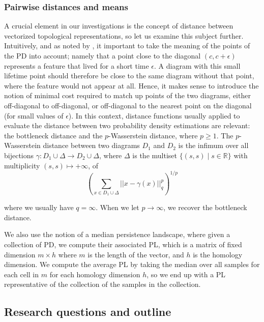 \documentclass{article}
\begin{document}
\subsubsection{Pairwise distances and means}

A crucial element in our investigations is the concept of distance between vectorized topological representations, so let us examine this subject further. Intuitively, and as noted by \citep{berwald2018computing}, it important to take the meaning of the points of the PD into account; namely that a point close to the diagonal $(c,c+\epsilon)$ represents a feature that lived for a short time $\epsilon$. A diagram with this small lifetime point should therefore be close to the same diagram without that point, where the feature would not appear at all. Hence, it makes sense to introduce the notion of minimal cost required to match up points of the two diagrams, either off-diagonal to off-diagonal, or off-diagonal to  the nearest point on the diagonal (for small values of $\epsilon$). In this context, distance functions usually applied to evaluate the distance between two probability density estimations are relevant: the bottleneck distance and the $p$-Wasserstein distance, where $p\geq 1$. The $p$-Wasserstein distance between two diagrams $D_1$ and $D_2$ is the infimum over all bijections $\gamma: D_1 \cup \Delta \to D_2 \cup \Delta$, where $\Delta$ is the multiset $\lbrace (s, s) \mid s \in \mathbb{R} \rbrace$ with multiplicity $(s,s) \mapsto +\infty$, of
\begin{equation}
  \label{eq:wasserstein_distance}
  \left(\sum_{x \in D_1 \cup \Delta} ||x - \gamma(x)||_q^p \right)^{1/p}
\end{equation}

where we usually have $q=\infty$. When we let $p\to\infty$, we recover the bottleneck distance.

We also use the notion of a median persistence landscape, where given a collection of PD, we compute their associated PL, which is a matrix of fixed dimension $m\times h$ where $m$ is the length of the vector, and $h$ is the homology dimension. We compute the average PL by taking the median over all samples for each cell in $m$ for each homology dimension $h$, so we end up with a PL representative of the collection of the samples in the collection.

\subsection{Research questions and outline}
\end{document}
